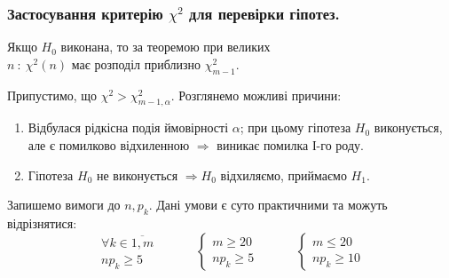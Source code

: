 \subsubsection{Застосування критерію \( \chi^2 \) для перевірки гіпотез.}
Якщо \( H_0 \) виконана, то за теоремою при великих \( n \ : \
\chi^2(n) \text{ має розподіл приблизно } \chi^2_{m-1}\). \par
Припустимо, що \(  \chi^2  > \chi_{m-1, \alpha}^2 \). Розглянемо можливі причини:
\begin{enumerate}
  \item Відбулася рідкісна подія ймовірності \( \alpha \); при цьому гіпотеза \( H_0 \) виконується, але є помилково відхиленною \( \Longrightarrow  \) виникає помилка І-го роду.
  \item Гіпотеза \( H_0 \) не виконується \( \Longrightarrow   H_0 \) відхиляємо, приймаємо \( H_1 \).
\end{enumerate}
Запишемо вимоги до $n, p_k$. Дані умови є суто практичними та можуть відрізнятися:
\[
 \begin{gathered}
  \forall k \in \overline{1, m}\\
np_k \geq 5
 \end{gathered} \qquad\quad \begin{cases}
  m \geq 20 \\
  np_k \geq  5
 \end{cases}
 \qquad \quad
 \begin{cases}
  m \leq 20 \\
  np_k \geq  10
 \end{cases}
\]
